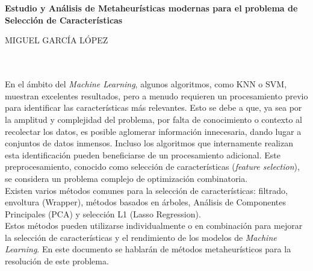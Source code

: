 \chapter*{}


\cleardoublepage
\thispagestyle{empty}

\begin{center}
       {\large\bfseries Estudio y Análisis de Metaheurísticas modernas para el problema de Selección de Características}\\
\end{center}
\begin{center}
       MIGUEL GARCÍA LÓPEZ\\
\end{center}

\\

\vspace{0.7cm}
\\

En el ámbito del \textit{Machine Learning}, algunos algoritmos, como KNN o SVM, muestran excelentes resultados, pero a menudo requieren un procesamiento previo para identificar las características más relevantes. Esto se debe a que, ya sea por la amplitud y complejidad del problema, por falta de conocimiento o contexto al recolectar los datos, es posible aglomerar información innecesaria, dando lugar a conjuntos de datos inmensos. Incluso los algoritmos que internamente realizan esta identificación pueden beneficiarse de un procesamiento adicional. Este preprocesamiento, conocido como selección de características (\textit{feature selection}), se considera un problema complejo de optimización combinatoria.\\[6pt]

Existen varios métodos comunes para la selección de características: filtrado, envoltura (Wrapper), métodos basados en árboles, Análisis de Componentes Principales (PCA) y selección L1 (Lasso Regression).\\[6pt]

Estos métodos pueden utilizarse individualmente o en combinación para mejorar la selección de características y el rendimiento de los modelos de \textit{Machine Learning}. En este documento se hablarán de métodos metaheurísticos para la resolución de este problema.\\[6pt]


